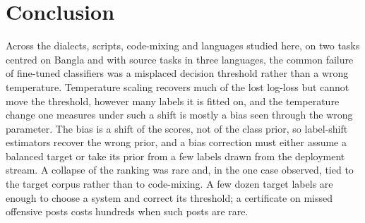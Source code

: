 \section{Conclusion}
\label{sec:conclusion}

Across the dialects, scripts, code-mixing and languages studied here, on two tasks centred on Bangla and with source
tasks in three languages, the common failure of fine-tuned classifiers was a misplaced decision threshold rather than
a wrong temperature. Temperature scaling recovers much of the lost log-loss but cannot move the threshold, however
many labels it is fitted on, and the temperature change one measures under such a shift is mostly a bias seen through
the wrong parameter. The bias is a shift of the scores, not of the class prior, so label-shift estimators recover the
wrong prior, and a bias correction must either assume a balanced target or take its prior from a few labels drawn from
the deployment stream. A collapse of the ranking was rare and, in the one case observed, tied to the target corpus
rather than to code-mixing. A few dozen target labels are enough to choose a system and correct its threshold; a
certificate on missed offensive posts costs hundreds when such posts are rare.

